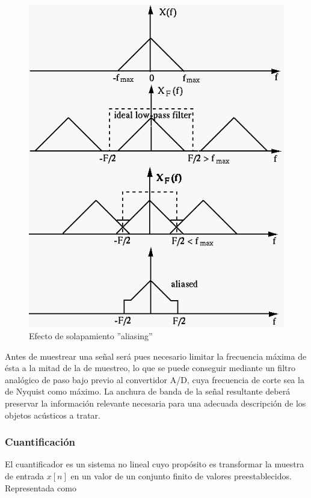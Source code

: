\begin{figure}[H]
	\centering
	\includegraphics[scale = 0.6]{figures/aliasing}
	\caption{Efecto de solapamiento ''aliasing''}
	\label{fig:aliasing}
\end{figure}

Antes de muestrear una señal será pues necesario limitar la frecuencia máxima de ésta a la mitad de la de muestreo, lo que se puede conseguir mediante un filtro analógico de paso bajo previo al convertidor A/D, cuya frecuencia de corte sea la de Nyquist como máximo. La anchura de banda de la señal resultante deberá preservar la información relevante necesaria para una adecuada descripción de los objetos acústicos a tratar. \cite{Casacuberta1987}

\subsubsection*{Cuantificación}

El cuantificador es un sistema no lineal cuyo propósito es transformar la muestra de entrada $x[n]$ en un valor de un conjunto finito de valores preestablecidos. Representada como

